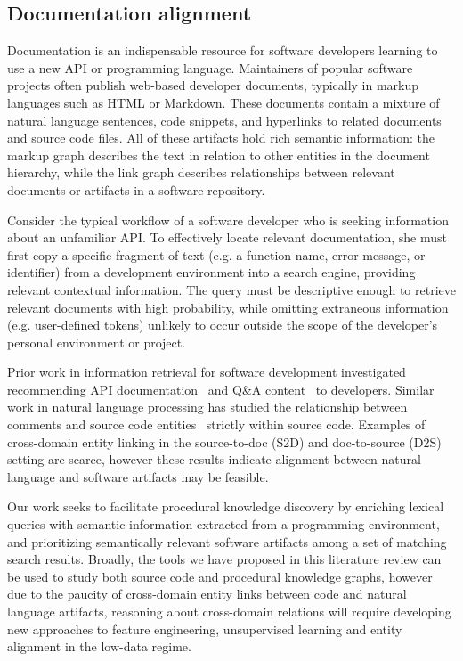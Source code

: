 \documentclass[10pt]{article}
\begin{document}
\pagebreak\subsection{Documentation alignment}\label{subsec:tracelink}

Documentation is an indispensable resource for software developers learning to use a new API or programming language. Maintainers of popular software projects often publish web-based developer documents, typically in markup languages such as HTML or Markdown. These documents contain a mixture of natural language sentences, code snippets, and hyperlinks to related documents and source code files. All of these artifacts hold rich semantic information: the markup graph describes the text in relation to other entities in the document hierarchy, while the link graph describes relationships between relevant documents or artifacts in a software repository.

Consider the typical workflow of a software developer who is seeking information about an unfamiliar API. To effectively locate relevant documentation, she must first copy a specific fragment of text (e.g. a function name, error message, or identifier) from a development environment into a search engine, providing relevant contextual information. The query must be descriptive enough to retrieve relevant documents with high probability, while omitting extraneous information (e.g. user-defined tokens) unlikely to occur outside the scope of the developer's personal environment or project.

Prior work in information retrieval for software development investigated recommending API documentation~\cite{robillard2015recommending} and Q\&A content~\cite{treude2016augmenting} to developers. Similar work in natural language processing has studied the relationship between comments and source code entities~\cite{iyer2018mapping, panthaplackel2020associating} strictly within source code. Examples of cross-domain entity linking in the source-to-doc (S2D) and doc-to-source (D2S) setting are scarce, however these results indicate alignment between natural language and software artifacts may be feasible.

Our work seeks to facilitate procedural knowledge discovery by enriching lexical queries with semantic information extracted from a programming environment, and prioritizing semantically relevant software artifacts among a set of matching search results. Broadly, the tools we have proposed in this literature review can be used to study both source code and procedural knowledge graphs, however due to the paucity of cross-domain entity links between code and natural language artifacts, reasoning about cross-domain relations will require developing new approaches to feature engineering, unsupervised learning and entity alignment in the low-data regime.
\end{document}
